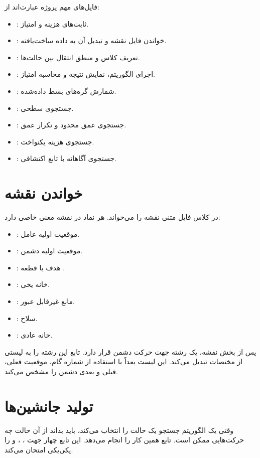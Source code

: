 \documentclass[10.5pt]{exam}
\begin{document}
فایل‌های مهم پروژه عبارت‌اند از:
\begin{itemize}
    \item {}: ثابت‌های هزینه و امتیاز.
    \item {}: خواندن فایل نقشه و تبدیل آن به داده ساخت‌یافته.
    \item {}: تعریف کلاس  و منطق انتقال بین حالت‌ها.
    \item {}: اجرای الگوریتم، نمایش نتیجه و محاسبه امتیاز.
    \item {}: شمارش گره‌های بسط داده‌شده.
    \item {}: جستجوی سطحی.
    \item {}: جستجوی عمق محدود و تکرار عمق.
    \item {}: جستجوی هزینه یکنواخت.
    \item {}: جستجوی آگاهانه با تابع اکتشافی.
\end{itemize}

\section{خواندن نقشه}
در
کلاس
فایل متنی نقشه را می‌خواند. هر نماد در نقشه معنی خاصی دارد:
\begin{itemize}
    \item {}: موقعیت اولیه عامل.
    \item {}: موقعیت اولیه دشمن.
    \item {}: هدف یا قطعه .
    \item {}: خانه یخی.
    \item {}: مانع غیرقابل عبور.
    \item {}: سلاح.
    \item {}: خانه عادی.
\end{itemize}

پس از بخش نقشه، یک رشته جهت حرکت دشمن قرار دارد. تابع
این رشته را به لیستی از مختصات تبدیل می‌کند. این لیست بعداً با استفاده از شماره گام، موقعیت فعلی، قبلی و بعدی دشمن را مشخص می‌کند.

\section{تولید جانشین‌ها}
وقتی یک الگوریتم جستجو یک حالت را انتخاب می‌کند، باید بداند از آن حالت چه حرکت‌هایی ممکن است. تابع
همین کار را انجام می‌دهد. این تابع چهار جهت
،
،
و
را یکی‌یکی امتحان می‌کند.
\end{document}

